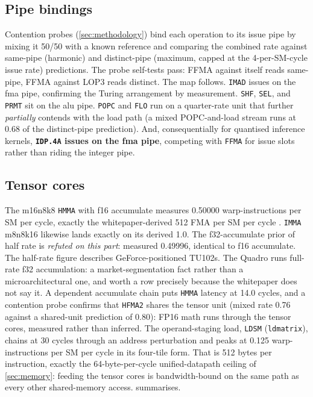 \subsection{Pipe bindings}

Contention probes (\cref{sec:methodology}) bind each operation to its
issue pipe by mixing it 50/50 with a known reference and comparing the
combined rate against same-pipe (harmonic) and distinct-pipe (maximum,
capped at the 4-per-SM-cycle issue rate) predictions. The probe
self-tests pass: FFMA against itself reads same-pipe, FFMA against
LOP3 reads distinct. The map follows. \texttt{IMAD} issues on the
fma pipe, confirming the Turing arrangement by measurement.
\texttt{SHF}, \texttt{SEL}, and \texttt{PRMT} sit on the alu pipe.
\texttt{POPC} and \texttt{FLO} run on a quarter-rate unit that further
\emph{partially} contends with the load path (a mixed POPC-and-load
stream runs at 0.68 of the distinct-pipe prediction). And,
consequentially for quantised inference kernels, \textbf{\texttt{IDP.4A}
issues on the fma pipe}, competing with \texttt{FFMA} for issue slots
rather than riding the integer pipe.

\subsection{Tensor cores}

The m16n8k8 \texttt{HMMA} with f16 accumulate measures 0.50000
warp-instructions per SM per cycle, exactly the whitepaper-derived 512
FMA per SM per cycle \citep{nvidia2018turing}. \texttt{IMMA} m8n8k16
likewise lands exactly on its derived 1.0. The f32-accumulate prior of
half rate is \emph{refuted on this part}: measured 0.49996, identical to
f16 accumulate. The half-rate figure describes GeForce-positioned TU102s.
The Quadro runs full-rate f32 accumulation: a market-segmentation
fact rather than a microarchitectural one, and worth a row precisely
because the whitepaper does not say it. A dependent accumulate chain puts
\texttt{HMMA} latency at 14.0 cycles, and a contention probe confirms
that \texttt{HFMA2} shares the tensor unit (mixed rate 0.76 against a
shared-unit prediction of 0.80): FP16 math runs through the tensor
cores, measured rather than inferred. The operand-staging load,
\texttt{LDSM} (\texttt{ldmatrix}), chains at 30 cycles through an
address perturbation and peaks at 0.125 warp-instructions per SM per
cycle in its four-tile form. That is 512 bytes per instruction, exactly
the 64-byte-per-cycle unified-datapath ceiling of \cref{sec:memory}:
feeding the tensor cores is bandwidth-bound on the same path as every
other shared-memory access.  summarises.

